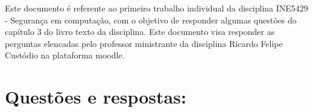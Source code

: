 \documentclass[
    article,            %
    11pt,               %
    oneside,            %
    a4paper,            %
    english,            %
    brazil,             %
    sumario=tradicional,
    ]{abntex2}
\begin{document}

\frenchspacing 


%
%

\maketitle


\begin{resumoumacoluna}
    Este documento é referente ao primeiro trabalho individual da disciplina INE5429 - Segurança em computação, com o objetivo de responder algumas questões do capítulo 3 do livro texto da disciplina. Este documento visa responder as perguntas elencadas pelo professor ministrante da disciplina Ricardo Felipe Custódio na plataforma moodle.
 
 \vspace{\onelineskip}
 
\end{resumoumacoluna}


\textual


\section*{\textbf{Questões e respostas:}}


\end{document}
